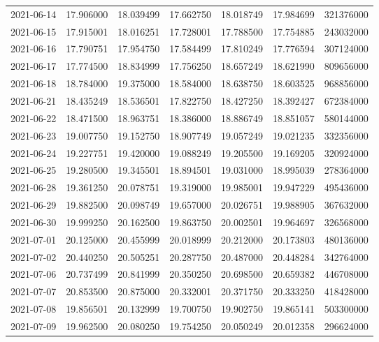 \begin{tabular}{lrrrrrr}
2021-06-14 &   17.906000 &   18.039499 &   17.662750 &   18.018749 &   17.984699 &   321376000 \\
2021-06-15 &   17.915001 &   18.016251 &   17.728001 &   17.788500 &   17.754885 &   243032000 \\
2021-06-16 &   17.790751 &   17.954750 &   17.584499 &   17.810249 &   17.776594 &   307124000 \\
2021-06-17 &   17.774500 &   18.834999 &   17.756250 &   18.657249 &   18.621990 &   809656000 \\
2021-06-18 &   18.784000 &   19.375000 &   18.584000 &   18.638750 &   18.603525 &   968856000 \\
2021-06-21 &   18.435249 &   18.536501 &   17.822750 &   18.427250 &   18.392427 &   672384000 \\
2021-06-22 &   18.471500 &   18.963751 &   18.386000 &   18.886749 &   18.851057 &   580144000 \\
2021-06-23 &   19.007750 &   19.152750 &   18.907749 &   19.057249 &   19.021235 &   332356000 \\
2021-06-24 &   19.227751 &   19.420000 &   19.088249 &   19.205500 &   19.169205 &   320924000 \\
2021-06-25 &   19.280500 &   19.345501 &   18.894501 &   19.031000 &   18.995039 &   278364000 \\
2021-06-28 &   19.361250 &   20.078751 &   19.319000 &   19.985001 &   19.947229 &   495436000 \\
2021-06-29 &   19.882500 &   20.098749 &   19.657000 &   20.026751 &   19.988905 &   367632000 \\
2021-06-30 &   19.999250 &   20.162500 &   19.863750 &   20.002501 &   19.964697 &   326568000 \\
2021-07-01 &   20.125000 &   20.455999 &   20.018999 &   20.212000 &   20.173803 &   480136000 \\
2021-07-02 &   20.440250 &   20.505251 &   20.287750 &   20.487000 &   20.448284 &   342764000 \\
2021-07-06 &   20.737499 &   20.841999 &   20.350250 &   20.698500 &   20.659382 &   446708000 \\
2021-07-07 &   20.853500 &   20.875000 &   20.332001 &   20.371750 &   20.333250 &   418428000 \\
2021-07-08 &   19.856501 &   20.132999 &   19.700750 &   19.902750 &   19.865141 &   503300000 \\
2021-07-09 &   19.962500 &   20.080250 &   19.754250 &   20.050249 &   20.012358 &   296624000 \\

\end{tabular}
